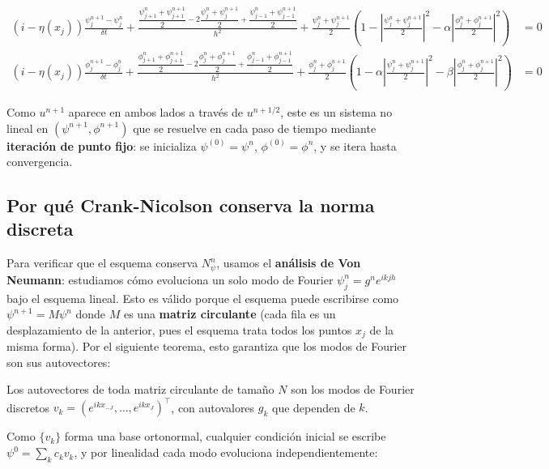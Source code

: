 \documentclass[letterpaper,11pt]{exam}
\theoremstyle{plain}
\begin{document}
{\footnotesize
\begin{align*}
    (i-\eta(x_j))\frac{\psi_j^{n+1}-\psi_j^n}{\delta t} + 
    \frac{\dfrac{\psi_{j+1}^n+\psi_{j+1}^{n+1}}{2} - 
    2\dfrac{\psi_j^n+\psi_j^{n+1}}{2} + 
    \dfrac{\psi_{j-1}^n+\psi_{j-1}^{n+1}}{2}}{h^2} + 
    \frac{\psi_j^n+\psi_j^{n+1}}{2}\left(1-
    \left|\frac{\psi_j^n+\psi_j^{n+1}}{2}\right|^2-
    \alpha\left|\frac{\phi_j^n+\phi_j^{n+1}}{2}\right|^2\right) &= 0 \\
    (i-\eta(x_j))\frac{\phi_j^{n+1}-\phi_j^n}{\delta t} + 
    \frac{\dfrac{\phi_{j+1}^n+\phi_{j+1}^{n+1}}{2} - 
    2\dfrac{\phi_j^n+\phi_j^{n+1}}{2} + 
    \dfrac{\phi_{j-1}^n+\phi_{j-1}^{n+1}}{2}}{h^2} + 
    \frac{\phi_j^n+\phi_j^{n+1}}{2}\left(1-
    \alpha\left|\frac{\psi_j^n+\psi_j^{n+1}}{2}\right|^2-
    \beta\left|\frac{\phi_j^n+\phi_j^{n+1}}{2}\right|^2\right) &= 0
\end{align*}}

\hspace{2mm}

Como $u^{n+1}$ 
aparece en ambos lados a través de $u^{n+1/2}$, este es un 
sistema no lineal en $(\psi^{n+1},\phi^{n+1})$ que se resuelve 
en cada paso de tiempo mediante \textbf{iteración de punto fijo}: 
se inicializa $\psi^{(0)}=\psi^n$, $\phi^{(0)}=\phi^n$, y se 
itera hasta convergencia.

\subsection{Por qué Crank-Nicolson conserva la norma discreta}

Para verificar que el esquema conserva $N_\psi^n$, usamos el 
\textbf{análisis de Von Neumann}: estudiamos cómo evoluciona 
un solo modo de Fourier $\psi_j^n = g^n e^{ikjh}$ bajo el 
esquema lineal. Esto es válido porque el esquema puede 
escribirse como $\psi^{n+1} = M\psi^n$ donde $M$ es una 
\textbf{matriz circulante} (cada fila es un desplazamiento 
de la anterior, pues el esquema trata todos los puntos $x_j$ 
de la misma forma). Por el siguiente teorema, esto garantiza 
que los modos de Fourier son sus autovectores:

\begin{theorem}
Los autovectores de toda matriz circulante de tamaño $N$ son 
los modos de Fourier discretos $v_k = (e^{ikx_{-J}},\ldots,
e^{ikx_J})^\top$, con autovalores $g_k$ que dependen de $k$.
\end{theorem}

Como $\{v_k\}$ forma una base ortonormal, cualquier condición 
inicial se escribe $\psi^0 = \sum_k c_k v_k$, y por linealidad 
cada modo evoluciona independientemente:
\end{document}
